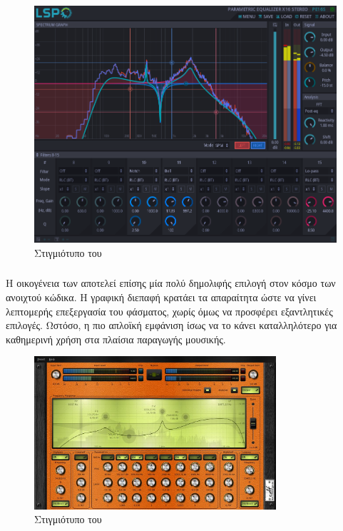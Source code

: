 \documentclass[12pt]{extarticle}
\begin{document}
\begin{figure}[!htb]
    \centering
    \includegraphics[width=.8\textwidth]{./assets/lsp_eq.png}
    \caption{Στιγμιότυπο του }
    \label{fig:}
\end{figure}

\subsubsection{}

Η οικογένεια των  \cite{Calf}  αποτελεί επίσης μία πολύ 
δημολιφής επιλογή στον κόσμο των  ανοιχτού κώδικα. 
Η γραφική διεπαφή κρατάει τα απαραίτητα ώστε να γίνει 
λεπτομερής επεξεργασία του φάσματος, χωρίς όμως να προσφέρει εξαντλητικές 
επιλογές. Ωστόσο, η πιο απλοϊκή εμφάνιση ίσως να το κάνει 
καταλληλότερο για καθημερινή χρήση στα πλαίσια παραγωγής μουσικής.

\begin{figure}[!htb]
    \centering
    \includegraphics[width=0.8\textwidth]{./assets/calf.png}
    \caption{Στιγμιότυπο του }
    \label{fig:}
\end{figure}
\end{document}
